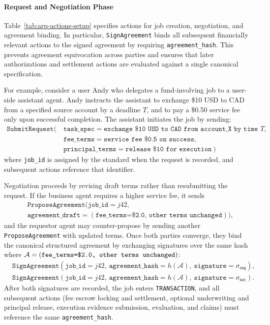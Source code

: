 \documentclass{article} %
\begin{document}
\paragraph{Request and Negotiation Phase}
Table~\ref{tab:arp-actions-setup} specifies actions for job creation, negotiation, and agreement binding. In particular, \texttt{SignAgreement} binds all subsequent financially relevant actions to the signed agreement by requiring \texttt{agreement\_hash}. This prevents agreement equivocation across parties and ensures that later authorizations and settlement actions are evaluated against a single canonical specification.

For example, consider a user Andy who delegates a fund-involving job to a user-side assistant agent. Andy instructs the assistant to exchange \$10 USD to CAD from a specified source account by a deadline $T$, and to pay a \$0.50 service fee only upon successful completion. The assistant initiates the job by sending:
\[
\begin{aligned}
\texttt{SubmitRequest}(\ &\texttt{task\_spec}=\texttt{exchange \$10 USD to CAD from account\_X by time $T$},\\
&\texttt{fee\_terms}=\texttt{service fee \$0.5 on success},\\ 
&\texttt{principal\_terms}=\texttt{release \$10 for execution}\ )
\end{aligned}
\]
where \texttt{job\_id} is assigned by the standard when the request is recorded, and subsequent actions reference that identifier. 

Negotiation proceeds by revising draft terms rather than resubmitting the request. If the business agent requires a higher service fee, it sends
\[
\begin{aligned}
&\texttt{ProposeAgreement}(\texttt{job\_id}=j42,\\ 
&\texttt{agreement\_draft}=(\texttt{fee\_terms=\$2.0,\ other terms unchanged})),
\end{aligned}
\]
and the requestor agent may counter-propose by sending another \texttt{ProposeAgreement} with updated terms. Once both parties converge, they bind the canonical structured agreement by exchanging signatures over the same hash where $\mathcal{A} = \text{(\texttt{fee\_terms=\$2.0,\ other terms unchanged})}$:
\[
\begin{aligned}
&\texttt{SignAgreement}(\texttt{job\_id}=j42,\ 
\texttt{agreement\_hash}=h(\mathcal{A}),\ 
\texttt{signature}=\sigma_{\textsf{req}}),\\
&\texttt{SignAgreement}(\texttt{job\_id}=j42,\ 
\texttt{agreement\_hash}=h(\mathcal{A}),\ 
\texttt{signature}=\sigma_{\textsf{svc}}).
\end{aligned}
\]
After both signatures are recorded, the job enters \texttt{TRANSACTION}, and all subsequent actions (fee escrow locking and settlement, optional underwriting and principal release, execution evidence submission, evaluation, and claims) must reference the same \texttt{agreement\_hash}.
 
\end{document}
